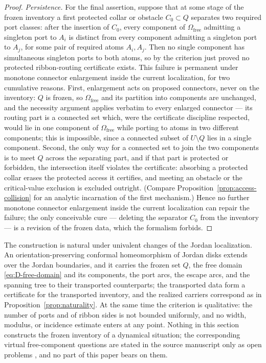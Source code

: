 \documentclass[11pt,reqno]{amsart}
\theoremstyle{definition}
\theoremstyle{remark}
\newcommand{\Omfree}{\Omega_{\mathrm{free}}}
\begin{document}
\begin{proof}
\emph{Persistence.}
For the final assertion, suppose that at some stage of the frozen inventory a first
protected collar or obstacle $C_0\subset Q$ separates two required port classes: after
the insertion of $C_0$, every component of $\Omfree$ admitting a singleton port to
$A_i$ is distinct from every component admitting a singleton port to $A_j$, for some
pair of required atoms $A_i,A_j$. Then no single component has simultaneous singleton
ports to both atoms, so by the criterion just proved no protected ribbon-routing
certificate exists. This failure is permanent under monotone connector enlargement
inside the current localization, for two cumulative reasons. First, enlargement acts on
proposed connectors, never on the inventory: $Q$ is frozen, so $\Omfree$ and its
partition into components are unchanged, and the necessity argument applies verbatim to
every enlarged connector --- its routing part is a connected set which, were the
certificate discipline respected, would lie in one component of $\Omfree$ while porting
to atoms in two different components; this is impossible, since a connected subset of
$U\setminus Q$ lies in a single component. Second, the only way for a connected set to
join the two components is to meet $Q$ across the separating part, and if that part is
protected or forbidden, the intersection itself violates the certificate: absorbing a
protected collar erases the protected access it certifies, and meeting an obstacle or
the critical-value exclusion is excluded outright. (Compare
Proposition~\ref{prop:access-collision} for an analytic incarnation of the first
mechanism.) Hence no further monotone connector enlargement inside the current
localization can repair the failure; the only conceivable cure --- deleting the
separator $C_0$ from the inventory --- is a revision of the frozen data, which the
formalism forbids.
\end{proof}

The construction is natural under univalent changes of the Jordan localization. An
orientation-preserving conformal homeomorphism of Jordan disks extends over the Jordan
boundaries, and it carries the frozen set $Q$, the free domain \eqref{eq:D-free-domain}
and its components, the port arcs, the escape arcs, and the spanning tree to their
transported counterparts; the transported data form a certificate for the transported
inventory, and the realized carriers correspond as in
Proposition~\ref{prop:naturality}. At the same time the criterion is qualitative: the
number of ports and of ribbon sides is not bounded uniformly, and no width, modulus, or
incidence estimate enters at any point. Nothing in this section constructs the frozen
inventory of a dynamical situation; the corresponding virtual free-component questions
are stated in the source manuscript only as open problems \cite{MWman}, and no part of
this paper bears on them.
\end{document}
